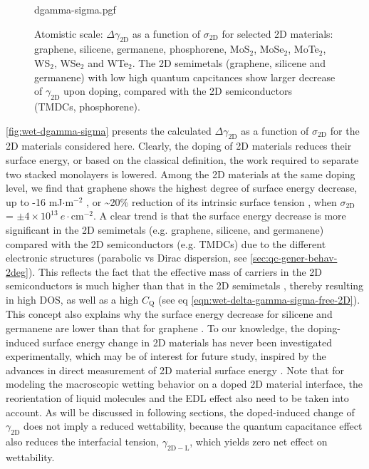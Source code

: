 \begin{figure}[!htbp]
  \centering
  {dgamma-sigma.pgf}
\caption{\label{fig:wet-dgamma-sigma} Atomistic scale:
  \(\Delta \gamma_{\mathrm{2D}}\) as a function of
  \(\sigma_{\mathrm{2D}}\) for selected 2D materials: graphene,
  silicene, germanene, phosphorene, MoS\(_{2}\), MoSe\(_{2}\),
  MoTe\(_{2}\), WS\(_{2}\), WSe\(_{2}\) and WTe\(_{2}\). The 2D
  semimetals (graphene, silicene and germanene) with low high quantum
  capcitances show larger decrease of \(\gamma_{\mathrm{2D}}\) upon
  doping, compared with the 2D semiconductors (TMDCs, phosphorene).}
\end{figure}

\autoref{fig:wet-dgamma-sigma} presents the calculated
\(\Delta \gamma_{\mathrm{2D}}\) as a function of
\(\sigma_{\mathrm{2D}}\) for the 2D materials considered
here.
%
Clearly, the doping of 2D materials reduces their surface
energy, or based on the classical definition, the work required to
separate two stacked monolayers is lowered.
%
Among the 2D materials at
the same doping level, we find that graphene shows the highest degree
of surface energy decrease, up to -16 mJ\(\cdot \mathrm{m}^{-2}\) , or
\textasciitilde{}20\% reduction of its intrinsic surface tension
\cite{shih_2013_wetting_natmat}, when \(\sigma_{\mathrm{2D}}\) =
\(\pm 4\times10^{13}\ e\cdot \mathrm{cm}^{-2}\).
%
A clear trend is that the surface energy decrease is more significant
in the 2D semimetals (e.g. graphene, silicene, and germanene) compared
with the 2D semiconductors (e.g. TMDCs) due to the different
electronic structures (parabolic vs Dirac dispersion, see
\autoref{sec:qc-gener-behav-2deg}).
%
This reflects the fact that the effective mass of carriers in the 2D
semiconductors is much higher than that in the 2D semimetals
\cite{Davies_1997_book}, thereby resulting in high DOS, as well as a
high \(C_{\mathrm{Q}}\) (see eq
\autoref{eqn:wet-delta-gamma-sigma-free-2D}). This concept also
explains why the surface energy decrease for silicene and germanene
are lower than that for graphene \cite{Yan_2013_e-hv-couple}.  To our
knowledge, the doping-induced surface energy change in 2D materials
has never been investigated experimentally, which may be of interest
for future study, inspired by the advances in direct measurement of 2D
material surface energy \cite{van_Engers_2017_direct_surf_gr}. Note
that for modeling the macroscopic wetting behavior on a doped 2D
material interface, the reorientation of liquid molecules and the EDL
effect also need to be taken into account.
%
As will be discussed
in following sections, the doped-induced change of \(\gamma_{\mathrm{2D}}\) does not
imply a reduced wettability, because the quantum capacitance effect
also reduces the interfacial tension, \(\gamma_{\mathrm{2D-L}}\),
which yields zero net effect on wettability.


